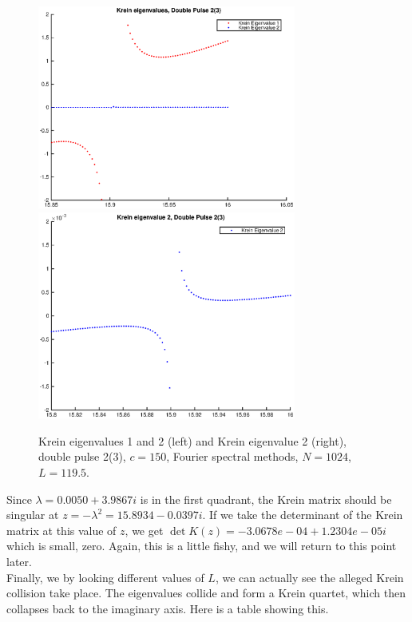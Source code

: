 \documentclass[12pt]{article}
\begin{document}
\begin{figure}[H]
	\includegraphics[width=8.5cm]{1500F_dp2_1195_krein1.eps}
	\includegraphics[width=8.5cm]{1500F_dp2_1195_krein2.eps}
	\caption{Krein eigenvalues 1 and 2 (left) and Krein eigenvalue 2 (right), double pulse 2(3), $c = 150$, Fourier spectral methods, $N = 1024$, $L = 119.5$. }
\end{figure}

Since $\lambda = 0.0050 + 3.9867i$ is in the first quadrant, the Krein matrix should be singular at $z = -\lambda^2 = 15.8934 - 0.0397i$. If we take the determinant of the Krein matrix at this value of $z$, we get $\det K(z) = -3.0678e-04 + 1.2304e-05i$ which is small, zero. Again, this is a little fishy, and we will return to this point later.\\

Finally, we by looking different values of $L$, we can actually see the alleged Krein collision take place. The eigenvalues collide and form a Krein quartet, which then collapses back to the imaginary axis. Here is a table showing this.
\end{document}

